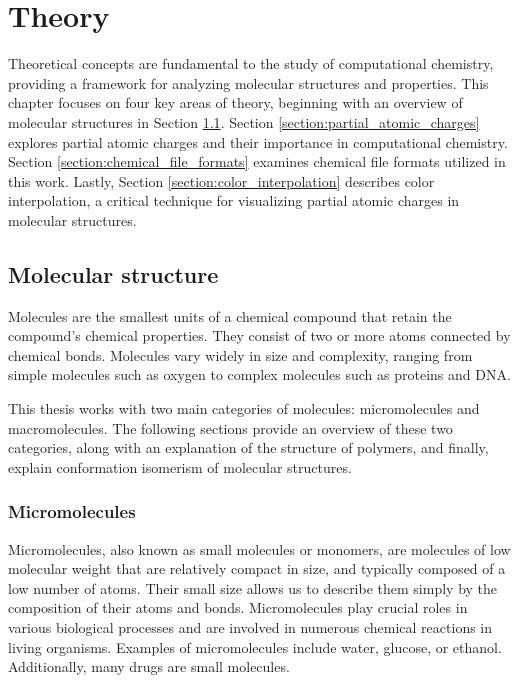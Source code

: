 \documentclass[
  digital,     %
  oneside,     %
  nosansbold,  %
  nocolorbold, %
  lof,         %
  lot,         %
]{fithesis4}
\begin{document}
\newpage
\chapter{Theory}
\label{chapter:theory}

Theoretical concepts are fundamental to the study of computational chemistry, providing a framework for analyzing molecular structures and properties. This chapter focuses on four key areas of theory, beginning with an overview of molecular structures in Section \ref{section:molecular_structure}. Section \ref{section:partial_atomic_charges} explores partial atomic charges and their importance in computational chemistry. Section \ref{section:chemical_file_formats} examines chemical file formats utilized in this work. Lastly, Section \ref{section:color_interpolation} describes color interpolation, a critical technique for visualizing partial atomic charges in molecular structures.

\section{Molecular structure}
\label{section:molecular_structure}

Molecules are the smallest units of a chemical compound that retain the compound's chemical properties. They consist of two or more atoms connected by chemical bonds. Molecules vary widely in size and complexity, ranging from simple molecules such as oxygen to complex molecules such as proteins and DNA. \cite{britannica_molecule}

This thesis works with two main categories of molecules: micromolecules and macromolecules. The following sections provide an overview of these two categories, along with an explanation of the structure of polymers, and finally, explain conformation isomerism of molecular structures.

\subsection{Micromolecules}

Micromolecules, also known as small molecules or monomers, are molecules of low molecular weight that are relatively compact in size, and typically composed of a low number of atoms. Their small size allows us to describe them simply by the composition of their atoms and bonds. Micromolecules play crucial roles in various biological processes and are involved in numerous chemical reactions in living organisms. \cite{clark2018biology,micromolecule_definition} Examples of micromolecules include water, glucose, or ethanol. Additionally, many drugs are small molecules. \cite{smallmoleculewiki}
\end{document}
